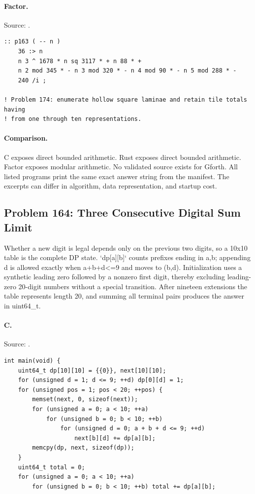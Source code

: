 \paragraph{Factor.} Source: .
\begin{lstlisting}
:: p163 ( -- n )
    36 :> n
    n 3 ^ 1678 * n sq 3117 * + n 88 * +
    n 2 mod 345 * - n 3 mod 320 * - n 4 mod 90 * - n 5 mod 288 * -
    240 /i ;

! Problem 174: enumerate hollow square laminae and retain tile totals having
! from one through ten representations.
\end{lstlisting}

\paragraph{Comparison.}
C exposes direct bounded arithmetic. Rust exposes direct bounded arithmetic. Factor exposes modular arithmetic.
No validated source exists for Gforth.
All listed programs print the same exact answer string from the manifest. The excerpts can differ in algorithm, data representation, and startup cost.

\subsection{Problem 164: Three Consecutive Digital Sum Limit}
\label{walkthrough:p164}
Whether a new digit is legal depends only on the previous two digits, so a 10x10 table is the complete DP state. `dp[a][b]` counts prefixes ending in a,b; appending d is allowed exactly when a+b+d<=9 and moves to (b,d). Initialization uses a synthetic leading zero followed by a nonzero first digit, thereby excluding leading-zero 20-digit numbers without a special transition. After nineteen extensions the table represents length 20, and summing all terminal pairs produces the answer in uint64\_t.

\paragraph{C.} Source: .
\begin{lstlisting}
int main(void) {
    uint64_t dp[10][10] = {{0}}, next[10][10];
    for (unsigned d = 1; d <= 9; ++d) dp[0][d] = 1;
    for (unsigned pos = 1; pos < 20; ++pos) {
        memset(next, 0, sizeof(next));
        for (unsigned a = 0; a < 10; ++a)
            for (unsigned b = 0; b < 10; ++b)
                for (unsigned d = 0; a + b + d <= 9; ++d)
                    next[b][d] += dp[a][b];
        memcpy(dp, next, sizeof(dp));
    }
    uint64_t total = 0;
    for (unsigned a = 0; a < 10; ++a)
        for (unsigned b = 0; b < 10; ++b) total += dp[a][b];
\end{lstlisting}

